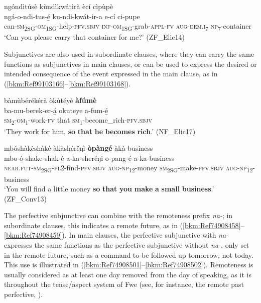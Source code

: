 \ea
\label{bkm:Ref99103146}
ngóndìtúsè kùndìkwátìrà ècí cìpùpè\\
\gll ngá-o-ndi-tus-é̲      ku-ndi-kwát-ir-a e-cí    ci-pupe \\
can-\textsc{sm}\textsubscript{2SG}-\textsc{om}\textsubscript{1SG}-help-\textsc{pfv}.\textsc{sbjv}  \textsc{inf}-\textsc{om}\textsubscript{1SG}-grab-\textsc{appl}-\textsc{fv}
\textsc{aug}-\textsc{dem}.\textsc{i}\textsubscript{7}  \textsc{np}\textsubscript{7}-container\\
\glt ‘Can you please carry that container for me?’ (ZF\_Elic14)
\z

Subjunctives are also used in subordinate clauses, where they can carry the same functions as subjunctives in main clauses, or can be used to express the desired or intended consequence of the event expressed in the main clause, as in (\ref{bkm:Ref99103166}--\ref{bkm:Ref99103168}).

\ea
\label{bkm:Ref99103166}
bàmùbérékérà òkùtéyè \textbf{àfúmè}\\
\gll ba-mu-berek-er-á̲  okuteye  a-fum-é̲\\
\textsc{sm}\textsubscript{2}-\textsc{om}\textsubscript{1}-work-\textsc{fv}  that    \textsc{sm}\textsubscript{1}-become\_rich-\textsc{pfv}.\textsc{sbjv}\\
\glt ‘They work for him, \textbf{so} \textbf{that} \textbf{he} \textbf{becomes} \textbf{rich}.’ (NF\_Elic17)
\z

\ea
\label{bkm:Ref99103168}
mbóshàkèsháké àkàshérêŋì \textbf{òpàngé} àkà-business\\
\gll mbo-ó̲-shake-shak-é̲      a-ka-sheréŋi o-pang-é̲      a-ka-business \\
\textsc{near}.\textsc{fut}-\textsc{sm}\textsubscript{2SG}-\textsc{pl}2-find-\textsc{pfv}.\textsc{sbjv}  \textsc{aug}-\textsc{np}\textsubscript{12}-money
\textsc{sm}\textsubscript{2SG}-make-\textsc{pfv}.\textsc{sbjv}  \textsc{aug}-\textsc{np}\textsubscript{12}-business\\
\glt ‘You will find a little money \textbf{so} \textbf{that} \textbf{you} \textbf{make} \textbf{a} \textbf{small} \textbf{business}.’ (ZF\_Conv13)
\z

The perfective subjunctive can combine with the remoteness prefix \textit{na-}; in subordinate clauses, this indicates a remote future, as in (\ref{bkm:Ref74908458}--\ref{bkm:Ref74908459}). In main clauses, the perfective subjunctive with \textit{na-} expresses the same functions as the perfective subjunctive without \textit{na-}, only set in the remote future, such as a command to be followed up tomorrow, not today. This use is illustrated in (\ref{bkm:Ref74908501}--\ref{bkm:Ref74908502}). Remoteness is usually considered as at least one day removed from the day of speaking, as it is throughout the tense/aspect system of Fwe (see, for instance, the remote past perfective, ).

